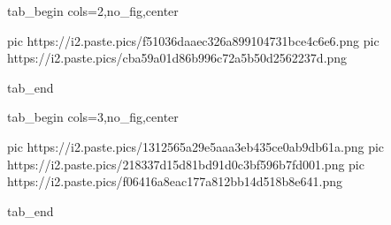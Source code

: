  
 
 
 
 


\ifcmt
  tab_begin cols=2,no_fig,center

     pic https://i2.paste.pics/f51036daaec326a899104731bce4c6e6.png
		 pic https://i2.paste.pics/cba59a01d86b996c72a5b50d2562237d.png

  tab_end

  tab_begin cols=3,no_fig,center

		pic https://i2.paste.pics/1312565a29e5aaa3eb435ce0ab9db61a.png
		pic https://i2.paste.pics/218337d15d81bd91d0c3bf596b7fd001.png
		pic https://i2.paste.pics/f06416a8eac177a812bb14d518b8e641.png

  tab_end
\fi
